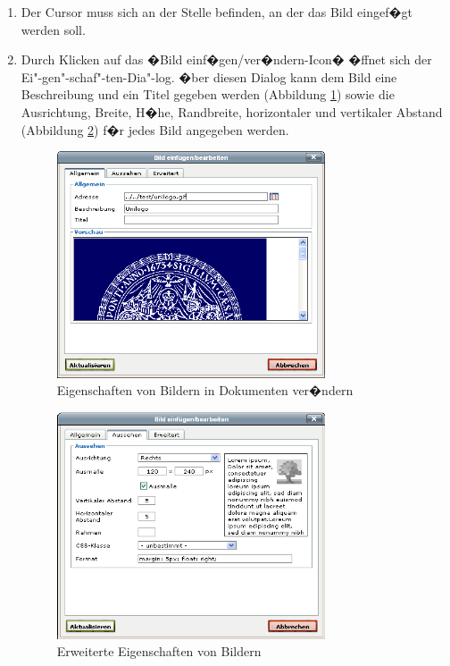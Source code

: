 \begin{enumerate}
	\item {Der Cursor muss sich an der Stelle befinden, an der das Bild eingef�gt
werden soll.}
	\item {Durch Klicken auf das �Bild einf�gen/ver�ndern-Icon� �ffnet sich der Ei"-gen"-schaf"-ten-Dia"-log. �ber
diesen Dialog kann dem Bild eine Beschreibung und ein Titel gegeben werden (Abbildung \ref{fig:tinymceimageprop1}) sowie die Ausrichtung,  Breite, H�he, Randbreite, horizontaler und vertikaler Abstand (Abbildung \ref{fig:tinymceimageprop2}) f�r jedes Bild angegeben werden.}


\begin{figure}[!ht]
	\centering
		\includegraphics[width=0.75\textwidth]{./images/tinymce-image-adv-1.png}
	\caption{Eigenschaften von Bildern in
Dokumenten ver�ndern}
	\label{fig:tinymceimageprop1}
\end{figure}

\begin{figure}[!ht]
	\centering
		\includegraphics[width=0.75\textwidth]{./images/tinymce-image-adv-2.png}
	\caption{Erweiterte Eigenschaften von Bildern}
	\label{fig:tinymceimageprop2}
\end{figure}


\end{enumerate}
